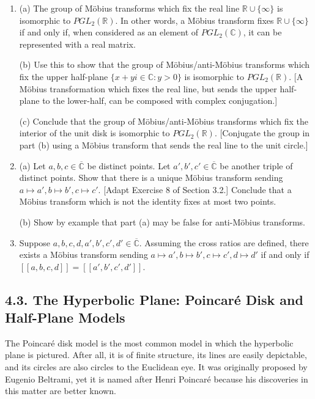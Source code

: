 \documentclass[leqno]{book}
\begin{document}
\begin{enumerate}
\item (a) The group of M\"obius transforms which fix the real line $\mathbb R\cup\{\infty\}$ is isomorphic to $PGL_2(\mathbb R)$.  In other words, a M\"obius transform fixes $\mathbb R\cup\{\infty\}$ if and only if, when considered as an element of $PGL_2(\mathbb C)$, it can be represented with a real matrix.

(b) Use this to show that the group of M\"obius/anti-M\"obius transforms which fix the upper half-plane $\{x+yi\in\mathbb C:y>0\}$ is isomorphic to $PGL_2(\mathbb R)$.  [A M\"obius transformation which fixes the real line, but sends the upper half-plane to the lower-half, can be composed with complex conjugation.]

(c) Conclude that the group of M\"obius/anti-M\"obius transforms which fix the interior of the unit disk is isomorphic to $PGL_2(\mathbb R)$.  [Conjugate the group in part (b) using a M\"obius transform that sends the real line to the unit circle.]

\item (a) Let $a,b,c\in\overline{\mathbb C}$ be distinct points.  Let $a',b',c'\in\overline{\mathbb C}$ be another triple of distinct points.  Show that there is a unique M\"obius transform sending $a\mapsto a',b\mapsto b',c\mapsto c'$. [Adapt Exercise 8 of Section 3.2.]  Conclude that a M\"obius transform which is not the identity fixes at most two points.

(b) Show by example that part (a) may be false for anti-M\"obius transforms.

\item Suppose $a,b,c,d,a',b',c',d'\in\overline{\mathbb C}$.  Assuming the cross ratios are defined, there exists a M\"obius transform sending $a\mapsto a',b\mapsto b',c\mapsto c',d\mapsto d'$ if and only if $[\![a,b,c,d]\!]=[\![a',b',c',d']\!]$.
\end{enumerate}

\subsection*{4.3. The Hyperbolic Plane: Poincar\'e Disk and Half-Plane Models}
The Poincar\'e disk model is the most common model in which the hyperbolic plane is pictured.  After all, it is of finite structure, its lines are easily depictable, and its circles are also circles to the Euclidean eye.  It was originally proposed by Eugenio Beltrami, yet it is named after Henri Poincar\'e because his discoveries in this matter are better known. %
\end{document}
